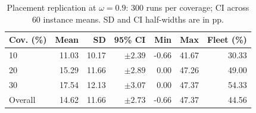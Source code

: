 \begin{table}[!t]
\centering
\footnotesize
\caption{Placement replication at $\omega=0.9$: 300 runs per coverage; CI across 60 instance means. SD and CI half-widths are in pp.}
\label{tab:multiseed_coverage}
\setlength{\tabcolsep}{3pt}
\renewcommand{\arraystretch}{1.12}
\begin{tabular}{lrrrrrr}
\toprule
Cov. (\%) & Mean & SD & 95\% CI & Min & Max & Fleet (\%) \\
\midrule
10 & 11.03 & 10.17 & $\pm 2.39$ & -0.66 & 41.67 & 30.33 \\
20 & 15.29 & 11.66 & $\pm 2.89$ & 0.00 & 47.26 & 49.00 \\
30 & 17.54 & 12.13 & $\pm 3.07$ & 0.00 & 47.37 & 54.33 \\
Overall & 14.62 & 11.66 & $\pm 2.73$ & -0.66 & 47.37 & 44.56 \\
\bottomrule
\end{tabular}
\end{table}
